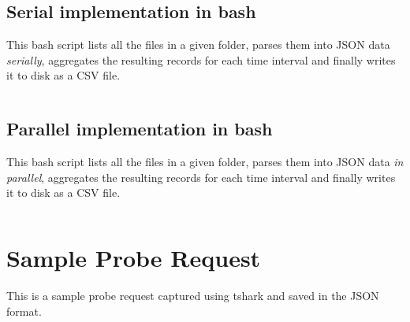 \subsection{Serial implementation in bash}
This bash script lists all the files in a given folder, parses them into JSON data \textit{serially}, aggregates the resulting records for each time interval and finally writes it to disk as a CSV file.
\vspace{1em}
\inputminted{bash}{analysis/data-toolkit/new-toolkit.sh}

\subsection{Parallel implementation in bash}

This bash script lists all the files in a given folder, parses them into JSON data \textit{in parallel}, aggregates the resulting records for each time interval and finally writes it to disk as a CSV file.
\vspace{1em}
\inputminted{bash}{analysis/data-toolkit/new-toolkit-parallel.sh}
\pagebreak


\section{Sample Probe Request} \label{appendix:sampleprobe}
This is a sample probe request captured using tshark and saved in the JSON format.

\vspace{1em}
\inputminted{javascript}{analysis/data-collection/samplepacket.json}


% 
